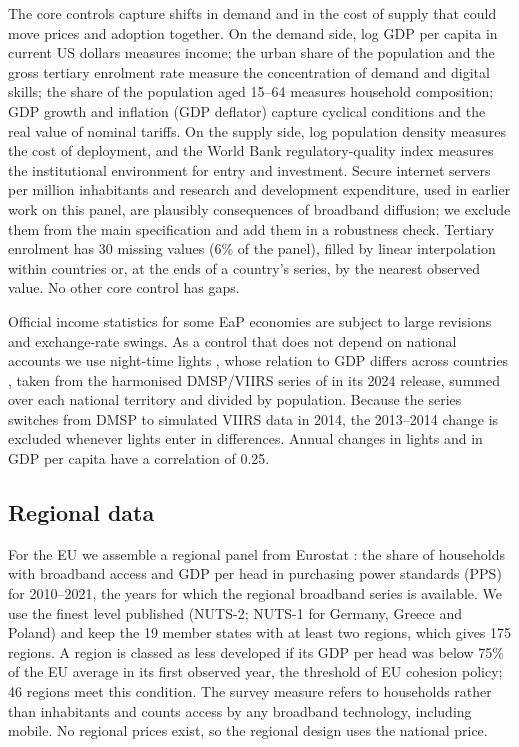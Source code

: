 \documentclass[pdflatex,sn-basic]{sn-jnl}
\begin{document}
The core controls capture shifts in demand and in the cost of supply that could move prices and adoption together. On the demand side, log GDP per capita in current US dollars measures income; the urban share of the population and the gross tertiary enrolment rate measure the concentration of demand and digital skills; the share of the population aged 15--64 measures household composition; GDP growth and inflation (GDP deflator) capture cyclical conditions and the real value of nominal tariffs. On the supply side, log population density measures the cost of deployment, and the World Bank regulatory-quality index \citep{worldbank2026wdi} measures the institutional environment for entry and investment. Secure internet servers per million inhabitants and research and development expenditure, used in earlier work on this panel, are plausibly consequences of broadband diffusion; we exclude them from the main specification and add them in a robustness check. Tertiary enrolment has 30 missing values (6\% of the panel), filled by linear interpolation within countries or, at the ends of a country's series, by the nearest observed value. No other core control has gaps.

Official income statistics for some EaP economies are subject to large revisions and exchange-rate swings. As a control that does not depend on national accounts we use night-time lights \citep{henderson2012measuring}, whose relation to GDP differs across countries \citep{phan2023lights}, taken from the harmonised DMSP/VIIRS series of \citet{li2020harmonized} in its 2024 release, summed over each national territory and divided by population. Because the series switches from DMSP to simulated VIIRS data in 2014, the 2013--2014 change is excluded whenever lights enter in differences. Annual changes in lights and in GDP per capita have a correlation of 0.25.

\subsection{Regional data}

For the EU we assemble a regional panel from Eurostat \citep{eurostat2024broad}: the share of households with broadband access and GDP per head in purchasing power standards (PPS) for 2010--2021, the years for which the regional broadband series is available. We use the finest level published (NUTS-2; NUTS-1 for Germany, Greece and Poland) and keep the 19 member states with at least two regions, which gives 175 regions. A region is classed as less developed if its GDP per head was below 75\% of the EU average in its first observed year, the threshold of EU cohesion policy; 46 regions meet this condition. The survey measure refers to households rather than inhabitants and counts access by any broadband technology, including mobile. No regional prices exist, so the regional design uses the national price.
\end{document}
